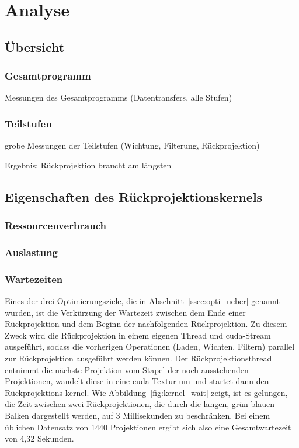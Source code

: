 \chapter{Analyse}

\section{Übersicht}

\subsection{Gesamtprogramm}

Messungen des Gesamtprogramms (Datentransfers, alle Stufen)

\subsection{Teilstufen}

grobe Messungen der Teilstufen (Wichtung, Filterung, Rückprojektion)

Ergebnis: Rückprojektion braucht am längsten

\section{Eigenschaften des Rückprojektionskernels}

\subsection{Ressourcenverbrauch}

\subsection{Auslastung}

\subsection{Wartezeiten}

Eines der drei Optimierungsziele, die in Abschnitt~\ref{ssec:opti_ueber} genannt wurden, ist die Verkürzung der Wartezeit
zwischen dem Ende einer Rückprojektion und dem Beginn der nachfolgenden Rückprojektion. Zu diesem Zweck wird die
Rückprojektion in einem eigenen Thread und \gls{cuda}-Stream ausgeführt, sodass die vorherigen Operationen (Laden,
Wichten, Filtern) parallel zur Rückprojektion ausgeführt werden können. Der Rückprojektionsthread entnimmt die nächste
Projektion vom Stapel der noch ausstehenden Projektionen, wandelt diese in eine \gls{cuda}-Textur um und startet dann
den Rückprojektions-\gls{kernel}. Wie Abbildung~\ref{fig:kernel_wait} zeigt, ist es gelungen, die Zeit zwischen zwei
Rückprojektionen, die durch die langen, grün-blauen Balken dargestellt werden, auf 3 Millisekunden zu beschränken. Bei
einem üblichen Datensatz von 1440 Projektionen ergibt sich also eine Gesamtwartezeit von 4,32 Sekunden.

